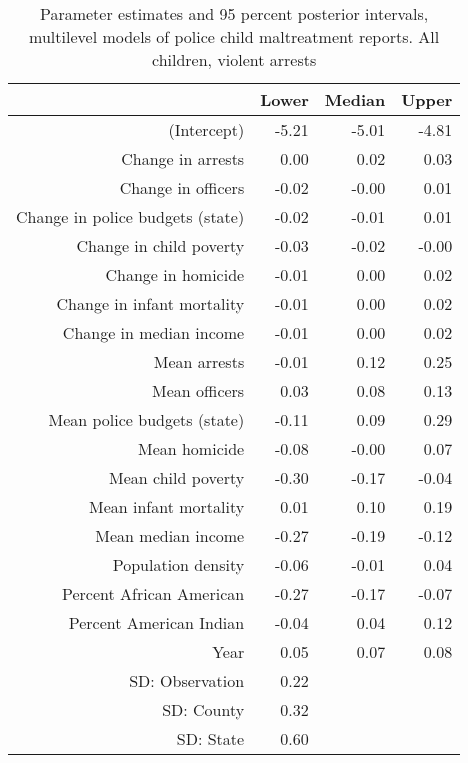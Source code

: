 \begin{table}[ht]
\centering
\begin{tabular}{rrrr}
  \hline
 & Lower & Median & Upper \\ 
  \hline
(Intercept) & -5.21 & -5.01 & -4.81 \\ 
  Change in arrests & 0.00 & 0.02 & 0.03 \\ 
  Change in officers & -0.02 & -0.00 & 0.01 \\ 
  Change in police budgets (state) & -0.02 & -0.01 & 0.01 \\ 
  Change in child poverty & -0.03 & -0.02 & -0.00 \\ 
  Change in homicide & -0.01 & 0.00 & 0.02 \\ 
  Change in infant mortality & -0.01 & 0.00 & 0.02 \\ 
  Change in median income & -0.01 & 0.00 & 0.02 \\ 
  Mean arrests & -0.01 & 0.12 & 0.25 \\ 
  Mean officers & 0.03 & 0.08 & 0.13 \\ 
  Mean police budgets (state) & -0.11 & 0.09 & 0.29 \\ 
  Mean homicide & -0.08 & -0.00 & 0.07 \\ 
  Mean child poverty & -0.30 & -0.17 & -0.04 \\ 
  Mean infant mortality & 0.01 & 0.10 & 0.19 \\ 
  Mean median income & -0.27 & -0.19 & -0.12 \\ 
  Population density & -0.06 & -0.01 & 0.04 \\ 
  Percent African American & -0.27 & -0.17 & -0.07 \\ 
  Percent American Indian & -0.04 & 0.04 & 0.12 \\ 
  Year & 0.05 & 0.07 & 0.08 \\ 
  SD: Observation & 0.22 &  &  \\ 
  SD: County & 0.32 &  &  \\ 
  SD: State & 0.60 &  &  \\ 
   \hline
\end{tabular}
\caption{Parameter estimates and 95 percent posterior intervals, multilevel models of 
             police child maltreatment reports. All children, violent arrests} 
\end{table}
